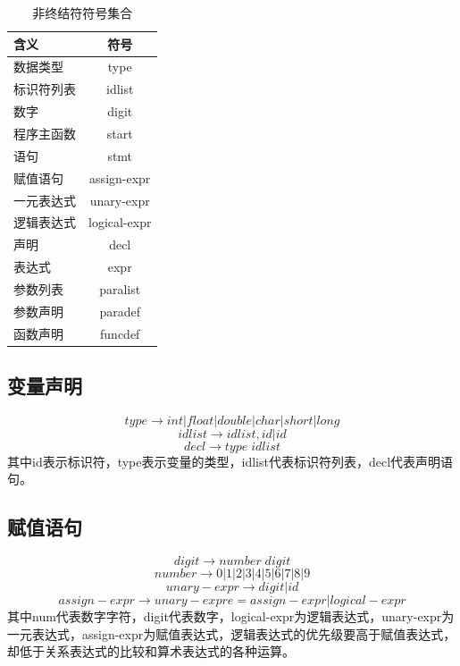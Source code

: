 \documentclass[lang=cn,11pt]{elegantpaper}
\begin{document}
\begin{table}[H]
  \small
  \centering
  \caption{非终结符符号集合}
    \begin{tabular}{l|c}
    \toprule
          含义          &       符号            \\
    \midrule
    数据类型  &  type\\
标识符列表  &  idlist\\
数字  &  digit\\
程序主函数  &  start\\
语句  &  stmt\\
赋值语句  &  assign-expr\\
一元表达式  &  unary-expr\\
逻辑表达式  &  logical-expr\\
声明  &  decl\\
表达式  &  expr\\
参数列表  &  paralist\\
参数声明  &  paradef\\
函数声明  &  funcdef\\
    \end{tabular}%
\end{table}%


\subsection{变量声明}
\begin{equation}
  type \to int|float|double|char|short|long 
\end{equation}
\begin{equation}
  idlist \to idlist,id|id
\end{equation}
\begin{equation}
decl \to type\;idlist
\end{equation}
其中id表示标识符，type表示变量的类型，idlist代表标识符列表，decl代表声明语句。
\setcounter{equation}{0}
\subsection{赋值语句}
\begin{equation}
digit \to number\;digit 
\end{equation}
\begin{equation}
  number \to 0|1|2|3|4|5|6|7|8|9
\end{equation}
\begin{equation}
unary-expr \to digit|id
\end{equation}
\begin{equation}
  assign-expr \to unary-expre = assign-expr|logical-expr
  \end{equation}
其中num代表数字字符，digit代表数字，logical-expr为逻辑表达式，unary-expr为一元表达式，assign-expr为赋值表达式，逻辑表达式的优先级要高于赋值表达式，却低于关系表达式的比较和算术表达式的各种运算。
\end{document}
